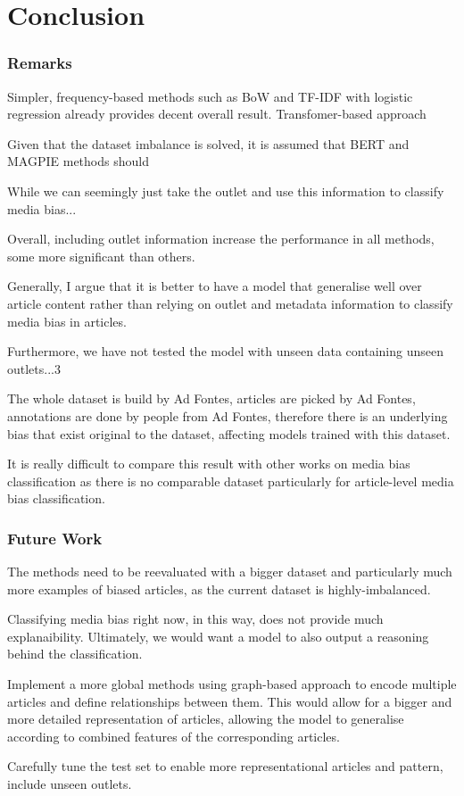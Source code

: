 \chapter{Conclusion}
\label{cha:7}

\subsection{Remarks}

Simpler, frequency-based methods such as BoW and TF-IDF with logistic regression already provides decent overall result. Transfomer-based approach 

Given that the dataset imbalance is solved, it is assumed that BERT and MAGPIE methods should 

While we can seemingly just take the outlet and use this information to classify media bias...

Overall, including outlet information increase the performance in all methods, some more significant than others.

Generally, I argue that it is better to have a model that generalise well over article content rather than relying on outlet and metadata information to classify media bias in articles.

Furthermore, we have not tested the model with unseen data containing unseen outlets...3

The whole dataset is build by Ad Fontes, articles are picked by Ad Fontes, annotations are done by people from Ad Fontes, therefore there is an underlying bias that exist original to the dataset, affecting models trained with this dataset.

It is really difficult to compare this result with other works on media bias classification as there is no comparable dataset particularly for article-level media bias classification.

\subsection{Future Work}

The methods need to be reevaluated with a bigger dataset and particularly much more examples of biased articles, as the current dataset is highly-imbalanced.

Classifying media bias right now, in this way, does not provide much explanaibility. Ultimately, we would want a model to also output a reasoning behind the classification.

Implement a more global methods using graph-based approach to encode multiple articles and define relationships between them. This would allow for a bigger and more detailed representation of articles, allowing the model to generalise according to combined features of the corresponding articles.

Carefully tune the test set to enable more representational articles and pattern, include unseen outlets.

